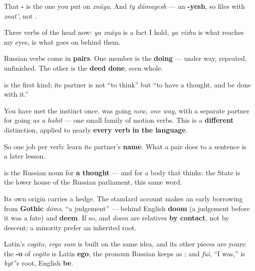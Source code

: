 That \textbf{-} is the one you put on \emph{znáyu}. And \emph{ty dúmayesh} — an \textbf{-yesh}, so \emph{} files with \emph{znat'}, not \emph{}.

Three verbs of the head now: \emph{ya znáyu} is a fact I hold, \emph{ya vízhu} is what reaches my eyes, \textbf{ } is what goes on behind them.

\begin{grammarlens}[title={Grammar Lens: every Russian verb travels with a partner}]
Russian verbs come in \textbf{pairs}. One member is the \textbf{doing} — under way, repeated, unfinished. The other is the \textbf{deed done}, seen whole.

\emph{} is the first kind; its partner \textbf{} is not \textquotedblleft{}to think\textquotedblright{} but \textquotedblleft{}to have a thought, and be done with it.\textquotedblright{}

You have met the instinct once. \textbf{} was going \emph{now, one way}, with a separate partner for going \emph{as a habit} — one small family of motion verbs. This is a \textbf{different} distinction, applied to nearly \textbf{every verb in the language}.

So one job per verb: learn its partner's \textbf{name}. What a pair does to a sentence is a later lesson.
\end{grammarlens}

\begin{cousinweb}
\textbf{} is the Russian noun for \textbf{a thought} — and for a body that thinks: the State \textbf{} is the lower house of the Russian parliament, this same word.

Its own origin carries a hedge. The standard account makes \emph{} an early borrowing from \textbf{Gothic} \emph{dōms}, \textquotedblleft{}a judgement\textquotedblright{} — behind English \textbf{doom} (a judgement before it was a fate) and \textbf{deem}. If so, \emph{} and \emph{doom} are relatives \textbf{by contact}, not by descent; a minority prefer an inherited root.

Latin's \emph{cogito, ergo sum} is built on the same idea, and its other pieces are yours: the \textbf{-o} of \emph{cogito} is Latin \textbf{ego}, the pronoun Russian keeps as \textbf{}; and \emph{fuī}, \textquotedblleft{}I was,\textquotedblright{} is \emph{byt'}'s root, English \textbf{be}.
\end{cousinweb}

